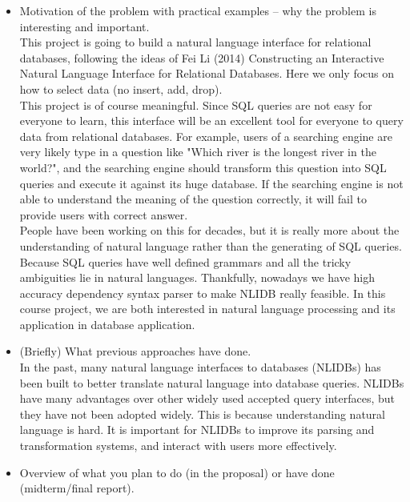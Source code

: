 \documentclass[twocolumn]{article}
\begin{document}
\begin{itemize}
\itemsep0em
	\item Motivation of the problem with practical examples -- why the problem is interesting and important.\\
	
    This project is going to build a natural language interface for relational databases, following the ideas of Fei Li (2014) Constructing an Interactive Natural Language Interface for Relational Databases. Here we only focus on how to select data (no insert, add, drop).\\
	
	This project is of course meaningful. Since SQL queries are not easy for everyone to learn, this interface will be an excellent tool for everyone to query data from relational databases. For example, users of a searching engine are very likely type in a question like "Which river is the longest river in the world?", and the searching engine should transform this question into SQL queries and execute it against its huge database. If the searching engine is not able to understand the meaning of the question correctly, it will fail to provide users with correct answer.\\
	People have been working on this for decades, but it is really more about the understanding of natural language rather than the generating of SQL queries. Because SQL queries have well defined grammars and all the tricky ambiguities lie in natural languages. Thankfully, nowadays we have high accuracy dependency syntax parser to make NLIDB really feasible. In this course project, we are both interested in natural language processing and its application in database application.\\
	\item (Briefly) What previous approaches have done.\\
	
	In the past, many natural language interfaces to databases (NLIDBs) has been built to better translate natural language into database queries. NLIDBs have many advantages over other widely used accepted query interfaces, but they have not been adopted widely. This is because understanding natural language is hard. It is important for NLIDBs to improve its parsing and transformation systems, and interact with users more effectively. \cite{li2014}\\
	\item Overview of what you plan to do (in the proposal) or have done (midterm/final report).\\
	

\end{itemize}
\end{document}

